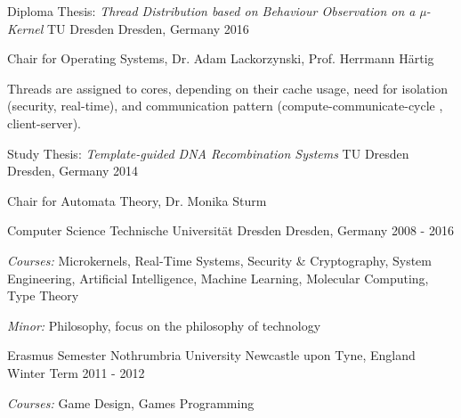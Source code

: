\begin{cventries}
  \cventry
    {Diploma Thesis: \newline \quad
      \textit{Thread Distribution based on Behaviour Observation on a µ-Kernel}}
    {TU Dresden}
    {Dresden, Germany}
    {2016}
    {
      \begin{cvitems}
      \item{Chair for Operating Systems, Dr. Adam Lackorzynski, Prof. Herrmann
	Härtig}
      \item {Threads are assigned to cores, depending on their cache usage,
	  need for isolation (security, real-time), and communication pattern
	  (compute-communicate-cycle , client-server).}
      \end{cvitems}
    }
  \cventry
    {Study Thesis:\quad
      \textit{Template-guided DNA Recombination Systems}}
    {TU Dresden}
    {Dresden, Germany}
    {2014}
    {
      \begin{cvitems}
      \item[] {Chair for Automata Theory, Dr. Monika Sturm}
      \end{cvitems}
    }
  \cventry
    {Computer Science}
    {Technische Universität Dresden}
    {Dresden, Germany}
    {2008 - 2016}
    {
      \begin{cvitems}
      \item {\textit{Courses:} Microkernels, Real-Time Systems, Security \&
	  Cryptography, System Engineering, Artificial Intelligence,
	  Machine Learning, \newline \quad Molecular Computing, Type Theory}
      \item {\textit{Minor:} Philosophy, focus on the philosophy of technology}
      \end{cvitems}
    }
  \cventry
    {Erasmus Semester}
    {Nothrumbria University}
    {Newcastle upon Tyne, England}
    {Winter Term 2011 - 2012}
    {
      \begin{cvitems}
      \item[] {\textit{Courses:} Game Design, Games Programming }
      \end{cvitems}
}
\end{cventries}
